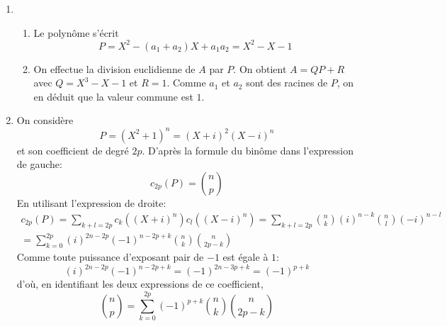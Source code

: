 \begin{enumerate}
 \item
\begin{enumerate}
 \item Le polynôme s'écrit
\begin{displaymath}
 P = X^2-(a_1+a_2)X+a_1a_2 = X^2-X-1
\end{displaymath}
 \item On effectue la division euclidienne de $A$ par $P$. On obtient $A=QP+R$ avec $Q=X^3-X-1$ et $R=1$. Comme $a_1$ et $a_2$ sont des racines de $P$, on en déduit que la valeur commune est $1$.
\end{enumerate}
 
 \item On considère 
\begin{displaymath}
 P=(X^2+1)^n=(X+i)^2(X-i)^n
\end{displaymath}
et son coefficient de degré $2p$.\newline
D'après la formule du binôme dans l'expression de gauche:
\begin{displaymath}
 c_{2p}(P)=\binom{n}{p}
\end{displaymath}
En utilisant l'expression de droite:
\begin{multline*}
 c_{2p}(P)= \sum _{k+l=2p}c_k((X+i)^n)c_l((X-i)^n)
=\sum _{k+l=2p}\binom{n}{k}(i)^{n-k}\binom{n}{l}(-i)^{n-l}\\
= \sum _{k=0}^{2p}(i)^{2n-2p}(-1)^{n-2p+k}\binom{n}{k}\binom{n}{2p-k}
\end{multline*}
Comme toute puissance d'exposant pair de $-1$ est égale à $1$:
\begin{displaymath}
 (i)^{2n-2p}(-1)^{n-2p+k} = (-1)^{2n-3p+k}=(-1)^{p+k}
\end{displaymath}
d'où, en identifiant les deux expressions de ce coefficient,
\begin{displaymath}
 \binom{n}{p} = \sum _{k=0}^{2p}(-1)^{p+k}\binom{n}{k}\binom{n}{2p-k}
\end{displaymath}

\end{enumerate}
